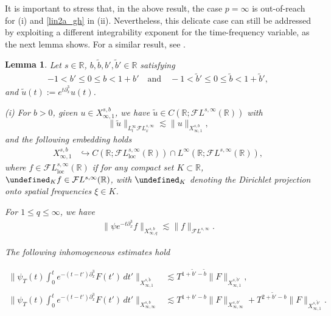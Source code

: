 \documentclass[a4paper,
11pt,  reqno]{amsart}
\newcommand{\5}{\textup{V}}
\newcommand{\noi}{\noindent}
\newcommand{\FL}{\mathcal{F} L}
\newcommand{\les}{\lesssim}
\newcommand{\wt}{\widetilde}
\newcommand{\embeds}{\hookrightarrow}
\newcommand{\dx}{\partial_x}
\newtheorem{lemma}[theorem]{Lemma}
\theoremstyle{remark}
\newcommand{\R}{\mathbb{R}}
\let\P= \undefined
\newcommand{\P}{\mathbf{P}}
\numberwithin{equation}{section}
\numberwithin{theorem}{section}
\begin{document}
        
		It is important to stress that, in the above result, the case $p=\infty$ is out-of-reach {for (i) and \eqref{lin2a_gh} in (ii)}. Nevertheless, this delicate case can still be addressed by exploiting a different integrability exponent for the time-frequency variable, as the next lemma shows. For a similar result, see \cite[Section 7]{CC24}. 
		
		\begin{lemma}\label{lem:linear_estimates}
			Let $s\in\R$, $b,\wt b, b', \wt b'\in\R$ satisfying
            \begin{align}
                \label{bs}
                -1 < b' \le 0 \le b < 1 + b'
                \quad 
                \text{and} 
                \quad 
                -1 < \wt b' \le 0 \le \wt b < 1 + \wt b', 
            \end{align}
        and $\wt u(t) := e^{t\dx^3 } u(t)$. 
        
            \noi 
			{\rm(i)} For $b>0$,  given $u\in X^{s,b}_{\infty,1}$, we have $\wt{u}\in C(\R;\FL^{s,\infty}(\R))$ with
			\begin{equation}\label{lin}
				\|\wt{u}\|_{L^\infty_t\FL^{s, \infty}_x}\lesssim \|u\|_{X^{s,b}_{\infty,1}}, 
			\end{equation}
			and the following embedding holds
			\noi
			\begin{align}
				X^{s,b}_{\infty, 1} &
                \embeds C(\R; \FL_{\mathrm{loc}}^{s,\infty}(\R))\cap L^\infty(\R; \FL^{s,\infty}(\R)), 
			\end{align}
            where $f \in \FL^{s, \infty}_{\mathrm{loc}}(\R)$ if for any compact set $K\subset \R$, $\P_K f \in \FL^{s, \infty}(\R)$, with $\P_K$  denoting the Dirichlet projection onto spatial frequencies $ \xi \in K$.


			
			\smallskip
			
			\noi {\rm(ii)} 
            For $ 1 \le q \le \infty$, we have 
			\begin{align}
				\label{lin1}
				\| \psi e^{-t\dx^3} f \|_{X^{s,b}_{\infty,q}} \les \| f \|_{\FL^{s,\infty}}.
			\end{align}

			
			\noi{\rm(iii)} 
            The following inhomogeneous estimates hold
            
			\noi
			\begin{align}
				\label{lin2a}
				\bigg\| \psi_T (t) \int_0^t e^{-(t-t')\dx^3 } F(t') \, dt' \bigg\|_{X^{s,\wt{b}}_{\infty,1} } & \les T^{1+\wt{b}'-\wt{b}} \| F \|_{X^{s,\wt{b}'}_{\infty,1}}
                ,
            \\
				\label{lin2b}
				\bigg\| \psi_T (t) \int_0^t e^{-(t-t')\dx^3} F(t') \, dt' \bigg\|_{X^{s,b}_{\infty, \infty} } 
                &
                \les T^{1+b'-b} \| F\|_{X^{s, b'}_{\infty, \infty}} + T^{2+\wt{b}' -b} \|F\|_{X^{s, \wt{b}'}_{\infty, 1}}.
			\end{align}
			
			
			
		\end{lemma}
		
\end{document}
